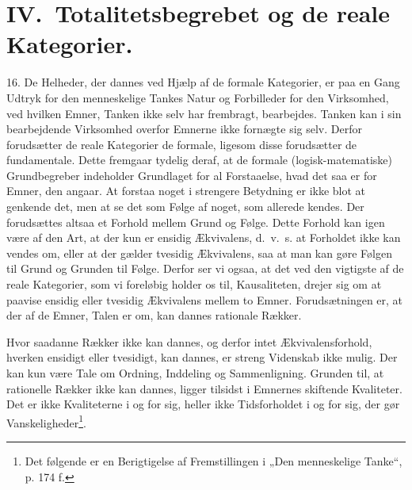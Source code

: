 \documentclass[12pt]{article}
\newcommand{\opage}[1]{\marginnote{\footnotesize\textit{[#1]}}}
\begin{document}
\section*{IV.\ Totalitetsbegrebet og de reale Kategorier.}

16. De Helheder, der dannes ved Hjælp af de formale Kategorier, er paa en Gang
Udtryk for den menneskelige Tankes Natur og Forbilleder for den Virksomhed, ved
hvilken Emner, Tanken ikke selv har frembragt, bearbejdes. Tanken kan i sin
bearbejdende Virksomhed overfor Emnerne ikke fornægte sig selv. Derfor
forudsætter de reale Kategorier de formale, ligesom disse forudsætter de
fundamentale. Dette fremgaar tydelig deraf, at de formale (logisk-matematiske)
Grundbegreber indeholder Grundlaget for al Forstaaelse, hvad det saa er for
Emner, den angaar. At forstaa noget i strengere Betydning er ikke blot at
genkende det, men at se det som Følge af noget, som allerede kendes. Der
forudsættes altsaa et Forhold mellem Grund og Følge. Dette Forhold kan igen
være af den Art, at der kun er ensidig Ækvivalens, d.~v.~s. at Forholdet ikke
kan vendes om, eller at der gælder tvesidig Ækvivalens, saa at man kan gøre
Følgen til Grund og Grunden til Følge. Derfor ser vi ogsaa, at det ved den
vigtigste af de reale Kategorier, som vi foreløbig holder
\setcounter{footnote}{0}%
\opage{43}os til, Kausaliteten, drejer sig om at paavise ensidig eller tvesidig
Ækvivalens mellem to Emner. Forudsætningen er, at der af de Emner, Talen er om,
kan dannes rationale Rækker.

Hvor saadanne Rækker ikke kan dannes, og derfor intet Ækvivalensforhold, hverken
ensidigt eller tvesidigt, kan dannes, er streng Videnskab ikke mulig. Der kan
kun være Tale om Ordning, Inddeling og Sammenligning. Grunden til, at rationelle
Rækker ikke kan dannes, ligger tilsidst i Emnernes skiftende Kvaliteter. Det er
ikke Kvaliteterne i og for sig, heller ikke Tidsforholdet i og for sig, der gør
Vanskeligheder\footnote{Det følgende er en Berigtigelse af Fremstillingen i „Den
menneskelige Tanke“, p. 174 f.}.
\end{document}
